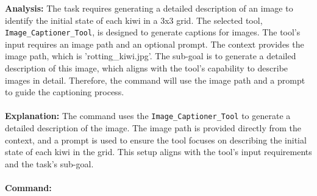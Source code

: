 \begin{executorbox}

\textbf{Analysis:}
The task requires generating a detailed description of an image to identify the initial state of each kiwi in a 3x3 grid. The selected tool, \texttt{Image\_Captioner\_Tool}, is designed to generate captions for images. The tool's input requires an image path and an optional prompt. The context provides the image path, which is 'rotting\_kiwi.jpg'. The sub-goal is to generate a detailed description of this image, which aligns with the tool's capability to describe images in detail. Therefore, the command will use the image path and a prompt to guide the captioning process.\\\\
\textbf{Explanation:}
The command uses the \texttt{Image\_Captioner\_Tool} to generate a detailed description of the image. The image path is provided directly from the context, and a prompt is used to ensure the tool focuses on describing the initial state of each kiwi in the grid. This setup aligns with the tool's input requirements and the task's sub-goal.
\\\\
\textbf{Command:}
\end{executorbox}


